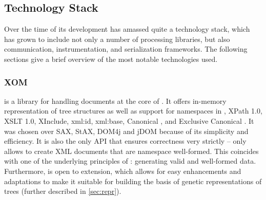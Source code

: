 \subsection{Technology Stack}
\label{sec:tech}
Over the time of its development \xmlmate has amassed quite a technology stack, which has grown to include not
only a number of \xml processing libraries, but also communication, instrumentation, and serialization
frameworks. The following sections give a brief overview of the most notable technologies used.
\tocless\subsubsection{XOM}
\xom{}\cite{xom} is a \java library for handling \xml documents at the core of \xmlmate. 
It offers in-memory representation of \xml tree structures as well as support for namespaces in \xml, {\small
XPath 1.0}, {\small XSLT 1.0}, {\small XInclude}, {\small xml:id}, {\small xml:base}, Canonical \xml, and Exclusive Canonical \xml.
It was chosen over {\small SAX}, {\small StAX}, {\small DOM4j} and {\small jDOM} because of its simplicity and
efficiency.
It is also the only \xml API that ensures correctness very strictly -- \xom only allows to create XML documents
that are namespace well-formed. 
This coincides with one of the underlying principles of \xmlmate: generating valid and well-formed data.
Furthermore, \xom is open to extension, which allows for easy enhancements and adaptations to make it suitable 
for building the basis of genetic representations of \xml trees (further described in \cref{sec:repr}).


